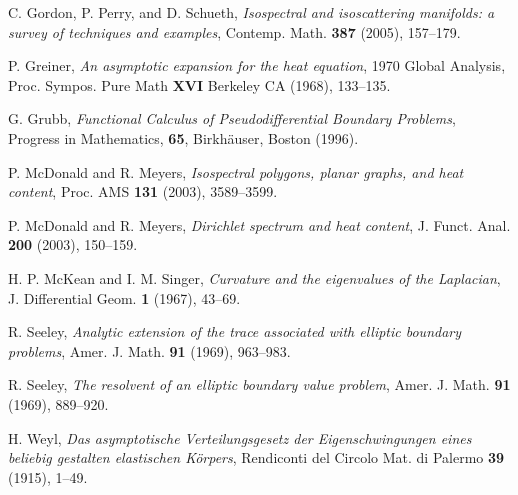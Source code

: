 \documentclass{amsart}
\begin{document}
\begin{thebibliography}{AA}
 C. Gordon, P. Perry, and D. Schueth,
\textit{Isospectral and isoscattering manifolds: a survey of
techniques and examples}, Contemp. Math. \textbf{387} (2005), 157--179.

 P. Greiner, 
\textit{An asymptotic expansion for the heat equation},
1970 Global Analysis, Proc. Sympos. Pure Math \textbf{XVI} Berkeley CA (1968), 133--135.

 G. Grubb, 
\textit{Functional Calculus of Pseudodifferential
Boundary Problems}, Progress in Mathematics, \textbf{65},
Birkh\"{a}user, Boston (1996).

 P. McDonald and R. Meyers, 
\textit{Isospectral polygons, planar graphs, and heat content},
Proc. AMS {\bf 131} (2003), 3589--3599.

 P. McDonald and R. Meyers, 
\textit{Dirichlet spectrum and heat content},
J. Funct. Anal. \textbf{200} (2003), 150--159.

 H. P. McKean and I. M. Singer, 
\textit{Curvature and the eigenvalues of the Laplacian}, 
 J. Differential Geom. \textbf{1} (1967), 43--69. 

 R. Seeley, 
\textit{Analytic extension of the trace associated with elliptic boundary problems},
Amer. J. Math. \textbf{91} (1969), 963--983.

 R. Seeley, 
\textit{The resolvent of an elliptic boundary value problem},
Amer. J. Math. \textbf{91} (1969), 889--920.

 H. Weyl,
\textit{Das asymptotische Verteilungsgesetz der Eigenschwingungen eines beliebig gestalten elastischen
    K\"orpers}, 
Rendiconti del Circolo Mat. di Palermo \textbf{39} (1915), 1--49.

\end{thebibliography}
\end{document}
